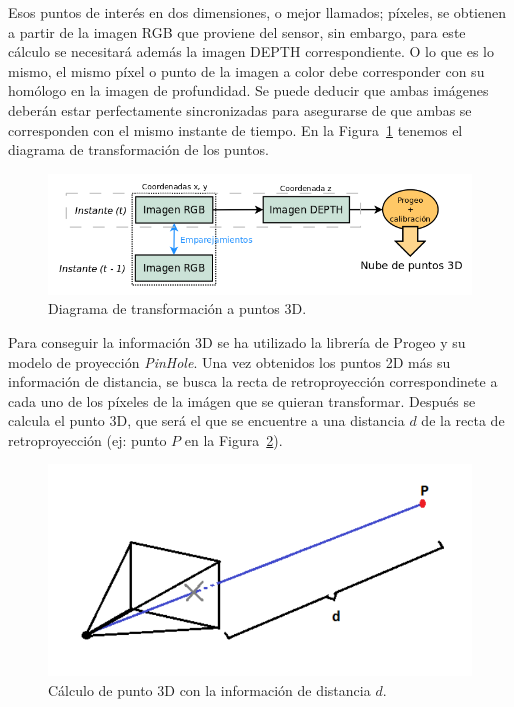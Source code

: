 Esos puntos de interés en dos dimensiones, o mejor llamados; píxeles, se obtienen a partir de la imagen RGB que proviene del sensor, sin embargo, para este cálculo se necesitará además la imagen DEPTH correspondiente. O lo que es lo mismo, el mismo píxel o punto de la imagen a color debe corresponder con su homólogo en la imagen de profundidad. Se puede deducir que ambas imágenes deberán estar perfectamente sincronizadas para asegurarse de que ambas se corresponden con el mismo instante de tiempo. En la Figura~\ref{fig:diagramPoints3d} tenemos el diagrama de transformación de los puntos.

\begin{figure}[th]
\centering
\includegraphics[scale=0.4]{Figures/diagram-points-3d.png}
\decoRule
\caption[diagram-points-3d]{Diagrama de transformación a puntos 3D.}
\label{fig:diagramPoints3d}
\end{figure}

Para conseguir la información 3D se ha utilizado la librería de Progeo y su modelo de proyección \textit{PinHole}. Una vez obtenidos los puntos 2D más su información de distancia, se busca la recta de retroproyección correspondinete a cada uno de los píxeles de la imágen que se quieran transformar. Después se calcula el punto 3D, que será el que se encuentre a una distancia $d$ de la recta de retroproyección (ej: punto $P$ en la Figura~\ref{fig:camLine}).

\begin{figure}[th]
\centering
\includegraphics[scale=0.35]{Figures/cam-line.png}
\decoRule
\caption[cam-line]{Cálculo de punto 3D con la información de distancia $d$.}
\label{fig:camLine}
\end{figure}

